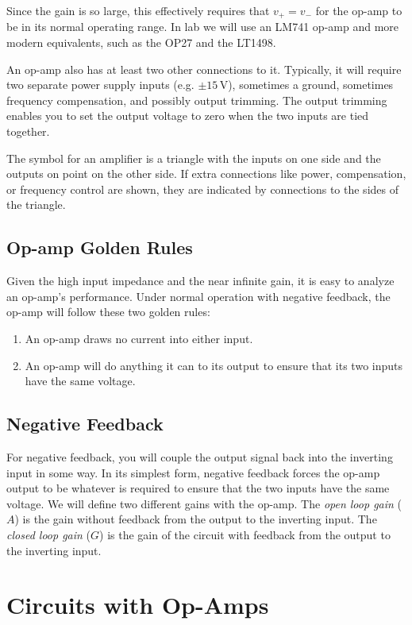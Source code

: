 \documentclass{article}
\begin{document}
Since the gain is so large, this effectively requires that $v_+ = v_-$ for the op-amp to be in its normal operating range. In lab we will use an LM741 op-amp and more modern equivalents, such as the OP27 and the LT1498.

An op-amp also has at least two other connections to it. Typically, it will require two separate power supply inputs (e.g. $\pm 15$\,V), sometimes a ground, sometimes frequency compensation, and possibly output trimming. The output trimming enables you to set the output voltage to zero when the two inputs are tied together.

The symbol for an amplifier is a triangle with the inputs on one side and the outputs on point on the other side. If extra connections like power, compensation, or frequency control are shown, they are indicated by connections to the sides of the triangle.

\subsection{Op-amp Golden Rules}
Given the high input impedance and the near infinite gain, it is easy to analyze an op-amp's performance. Under normal operation with negative feedback, the op-amp will follow these two golden rules:
\begin{enumerate}
\item An op-amp draws no current into either input.
\item An op-amp will do anything it can to its output to ensure that its two inputs have the same voltage.
\end{enumerate}

\subsection{Negative Feedback}
For negative feedback, you will couple the output signal back into the inverting input in some way. In its simplest form, negative feedback forces the op-amp output to be whatever is required to ensure that the two inputs have the same voltage. We will define two different gains with the op-amp.  The \emph{open loop gain} ($A$) is the gain without feedback from the output to the inverting input.  The \emph{closed loop gain} ($G$) is the gain of the circuit with feedback from the output to the inverting input. 

\section{Circuits with Op-Amps}
\end{document}

